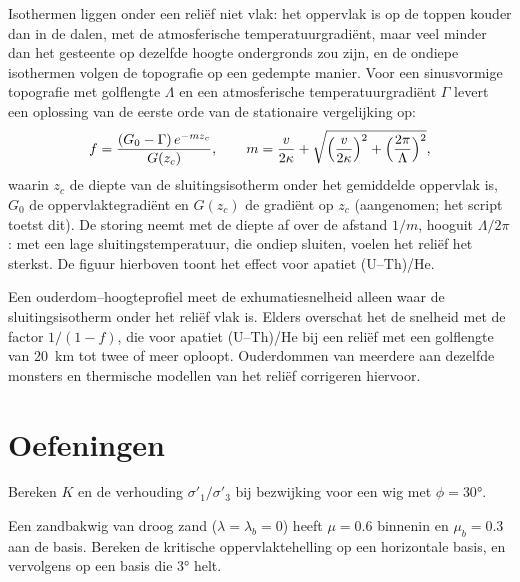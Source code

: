 Isothermen liggen onder een reliëf niet vlak: het oppervlak is op de toppen
kouder dan in de dalen, met de atmosferische temperatuurgradiënt, maar veel minder dan
het gesteente op dezelfde hoogte ondergronds zou zijn, en de ondiepe isothermen
volgen de topografie op een gedempte manier. Voor een sinusvormige topografie met
golflengte $\Lambda$ en een atmosferische temperatuurgradiënt $\Gamma$ levert een oplossing van de eerste orde van de
stationaire vergelijking op:
\[
  f = \frac{(G_0 - \Gamma)\,e^{-mz_c}}{G(z_c)},\qquad
  m = \frac{v}{2\kappa} + \sqrt{\Bigl(\frac{v}{2\kappa}\Bigr)^2 +
  \Bigl(\frac{2\pi}{\Lambda}\Bigr)^2},
\]
waarin $z_c$ de diepte van de sluitingsisotherm onder het gemiddelde oppervlak is,
$G_0$ de oppervlaktegradiënt en $G(z_c)$ de gradiënt op $z_c$ (aangenomen;
het script toetst dit). De storing neemt met de diepte af over de
afstand $1/m$, hooguit $\Lambda/2\pi$:  met een lage sluitingstemperatuur,
die ondiep sluiten, voelen het reliëf het sterkst. De figuur hierboven toont het effect
voor apatiet (U--Th)/He.

Een ouderdom--hoogteprofiel meet de exhumatiesnelheid alleen waar de
sluitingsisotherm onder het reliëf vlak is. Elders overschat het de snelheid met de factor $1/(1 - f)$, die voor apatiet (U--Th)/He bij een reliëf
met een golflengte van \qty{20}{km} tot twee of meer oploopt.
Ouderdommen van meerdere  aan dezelfde monsters en thermische modellen
van het reliëf corrigeren hiervoor.

\section{Oefeningen}

\begin{exercise}[$\star$]\label{exo:b3:orogenic-wedges:1}
Bereken $K$ en de verhouding $\sigma'_1/\sigma'_3$ bij bezwijking voor een wig met
$\phi = \ang{30}$.
\end{exercise}

\begin{exercise}[$\star$]\label{exo:b3:orogenic-wedges:2}
Een zandbakwig van droog zand ($\lambda = \lambda_b = 0$) heeft $\mu = 0.6$
binnenin en $\mu_b = 0.3$ aan de basis. Bereken de kritische oppervlaktehelling op een
horizontale basis, en vervolgens op een basis die \ang{3} helt.
\end{exercise}


